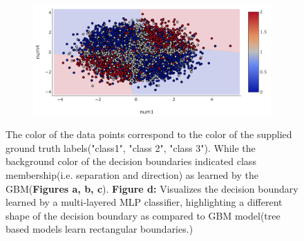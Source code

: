 \documentclass{article}
\begin{document}
\begin{figure}[H]
\begin{subfigure}[tb]{.5\textwidth}
\begin{center}
			\caption{}
			\label{fig:global_db}
			\end{center}
	\end{subfigure}%
	\begin{subfigure}[tb]{.5\textwidth}
		\begin{center}
			\includegraphics[width=\linewidth]{img/db_mlp_num1_num4}
			\caption{}
			\label{fig:global_db}
		\end{center}
	\end{subfigure}%
	\captionsetup{font=footnotesize}
	\caption{The color of the data points correspond to the color of the supplied ground truth labels("class1", "class 2", "class 3"). While the background color of the decision boundaries indicated class membership(i.e. separation and direction) as learned by the 
	GBM(\textbf{Figures a, b, c}). \textbf{Figure d:} Visualizes the decision boundary learned by a multi-layered MLP classifier, highlighting a different shape of the decision boundary as compared to GBM model(tree based models learn rectangular 
	boundaries.)}
\end{figure}
\end{document}
